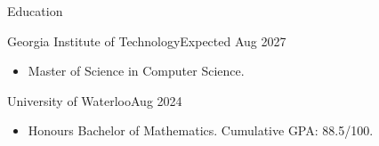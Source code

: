 \documentclass[]{mcdowellcv}
\begin{document}
	\makeheader
	\begin{cvsection}{Education}
		\begin{cvsubsection}{Georgia Institute of Technology}{}{Expected Aug 2027}
			\begin{itemize}
				\item Master of Science in Computer Science.
			\end{itemize}
		\end{cvsubsection}
		\begin{cvsubsection}{University of Waterloo}{}{Aug 2024}
			\begin{itemize}
				\item Honours Bachelor of Mathematics. Cumulative GPA: 88.5/100.
			\end{itemize}
		\end{cvsubsection}
	\end{cvsection}
\end{document}
